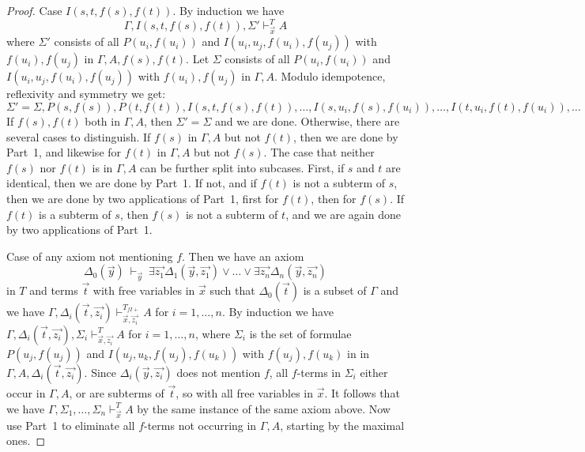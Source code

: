 \documentclass[10pt,a4paper]{article}
\begin{document}
\begin{proof}
Case $I(s,t,f(s),f(t))$. By induction we have 
\begin{equation}\label{ih:Istfsft}
\Gamma,I(s,t,f(s),f(t)),\Sigma'\vdash_{\vec{x}}^{T} A
\end{equation}
where $\Sigma'$ consists of all $P(u_i,f(u_i))$ and $I(u_i,u_j,f(u_i),f(u_j))$
with $f(u_i),f(u_j)$ in $\Gamma,A,f(s),f(t)$. 
Let $\Sigma$ consists of all $P(u_i,f(u_i))$ and $I(u_i,u_j,f(u_i),f(u_j))$
with $f(u_i),f(u_j)$ in $\Gamma,A$.
Modulo idempotence, reflexivity and symmetry we get:
\begin{equation}\label{eq:sigmas}
\Sigma' = \Sigma,P(s,f(s)),P(t,f(t)),I(s,t,f(s),f(t)),\ldots,I(s,u_i,f(s),f(u_i)),\ldots,I(t,u_i,f(t),f(u_i)),\ldots
\end{equation}
If $f(s),f(t)$ both in $\Gamma,A$,
then $\Sigma'=\Sigma$ and we are done. Otherwise, there are several cases
to distinguish. If $f(s)$ in $\Gamma,A$ but not $f(t)$, then we are done by Part~1,
and likewise for $f(t)$ in $\Gamma,A$ but not $f(s)$. The case that neither
$f(s)$ nor $f(t)$ is in $\Gamma,A$ can be further split into subcases. First, if $s$ and $t$
are identical, then we are done by Part~1. If not, and if $f(t)$ is not a subterm of $s$,
then we are done by two applications of Part~1, first for $f(t)$, then for $f(s)$.
If $f(t)$ is a subterm of $s$, then $f(s)$ is not a subterm of $t$, and we are 
again done by two applications of Part~1.

Case of any axiom not mentioning $f$. Then we have an axiom
$$
\Delta_0(\vec{y})~\vdash_{\vec{y}}~
\exists \vec{z_1}\Delta_1(\vec{y},\vec{z_1})\vee\dots\vee\exists \vec{z_n}\Delta_n(\vec{y},\vec{z_n})
$$
in $T$ and terms $\vec{t}$ with free variables in $\vec{x}$ such
that $\Delta_0(\vec{t})$ is a subset of $\Gamma$ and we have
$\Gamma,\Delta_i(\vec{t},\vec{z_i})\vdash_{\vec{x},\vec{z_i}}^{T_{f\!I\!{+}}} A$ 
for $i=1,\dots,n$.
By induction we have $\Gamma,\Delta_i(\vec{t},\vec{z_i}), \Sigma_i\vdash_{\vec{x},\vec{z_i}}^{T} A$
for $i = 1,\dots,n$, where $\Sigma_i$ is the set of formulae $P(u_j,f(u_j))$ and $I(u_j,u_k,f(u_j),f(u_k))$
with $f(u_j),f(u_k)$ in in $\Gamma,A,\Delta_i(\vec{t},\vec{z_i})$.
Since $\Delta_i(\vec{y},\vec{z_i})$ does not mention $f$, all $f$-terms in
$\Sigma_i$  either occur in $\Gamma,A$, or are subterms of $\vec{t}$, so with
all free variables in $\vec{x}$. It follows that we have
$\Gamma,\Sigma_1,\dots,\Sigma_n\vdash_{\vec{x}}^{T} A$
by the same instance of the same axiom above. Now use Part~1 to eliminate
all $f$-terms not occurring in $\Gamma,A$, starting by the maximal ones.
\end{proof}
\end{document}
